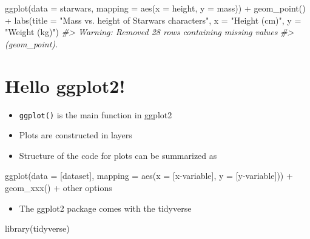 \documentclass[
]{book}
\newenvironment{Shaded}{\begin{snugshade}}{\end{snugshade}}
\newcommand{\AttributeTok}[1]{\textcolor[rgb]{0.77,0.63,0.00}{#1}}
\newcommand{\CommentTok}[1]{\textcolor[rgb]{0.56,0.35,0.01}{\textit{#1}}}
\newcommand{\FunctionTok}[1]{\textcolor[rgb]{0.00,0.00,0.00}{#1}}
\newcommand{\NormalTok}[1]{#1}
\newcommand{\SpecialCharTok}[1]{\textcolor[rgb]{0.00,0.00,0.00}{#1}}
\newcommand{\StringTok}[1]{\textcolor[rgb]{0.31,0.60,0.02}{#1}}
\providecommand{\tightlist}{%
  \setlength{\itemsep}{0pt}\setlength{\parskip}{0pt}}
\theoremstyle{definition}
\theoremstyle{definition}
\theoremstyle{definition}
\theoremstyle{definition}
\theoremstyle{remark}
\begin{document}
\begin{Shaded}
\begin{Highlighting}[]
\FunctionTok{ggplot}\NormalTok{(}\AttributeTok{data =}\NormalTok{ starwars, }\AttributeTok{mapping =} \FunctionTok{aes}\NormalTok{(}\AttributeTok{x =}\NormalTok{ height, }\AttributeTok{y =}\NormalTok{ mass)) }\SpecialCharTok{+}
  \FunctionTok{geom\_point}\NormalTok{() }\SpecialCharTok{+}
  \FunctionTok{labs}\NormalTok{(}\AttributeTok{title =} \StringTok{"Mass vs. height of Starwars characters"}\NormalTok{,}
       \AttributeTok{x =} \StringTok{"Height (cm)"}\NormalTok{, }\AttributeTok{y =} \StringTok{"Weight (kg)"}\NormalTok{)}
\CommentTok{\#\textgreater{} Warning: Removed 28 rows containing missing values}
\CommentTok{\#\textgreater{} (geom\_point).}
\end{Highlighting}
\end{Shaded}

\hypertarget{hello-ggplot2-1}{%
\section{Hello ggplot2!}\label{hello-ggplot2-1}}

\begin{itemize}
\tightlist
\item
  \texttt{ggplot()} is the main function in ggplot2
\item
  Plots are constructed in layers
\item
  Structure of the code for plots can be summarized as
\end{itemize}

\begin{Shaded}
\begin{Highlighting}[]
\FunctionTok{ggplot}\NormalTok{(}\AttributeTok{data =}\NormalTok{ [dataset], }
       \AttributeTok{mapping =} \FunctionTok{aes}\NormalTok{(}\AttributeTok{x =}\NormalTok{ [x}\SpecialCharTok{{-}}\NormalTok{variable], }\AttributeTok{y =}\NormalTok{ [y}\SpecialCharTok{{-}}\NormalTok{variable])) }\SpecialCharTok{+}
   \FunctionTok{geom\_xxx}\NormalTok{() }\SpecialCharTok{+}
\NormalTok{   other options}
\end{Highlighting}
\end{Shaded}

\begin{itemize}
\tightlist
\item
  The ggplot2 package comes with the tidyverse
\end{itemize}

\begin{Shaded}
\begin{Highlighting}[]
\FunctionTok{library}\NormalTok{(tidyverse)}
\end{Highlighting}
\end{Shaded}
\end{document}
